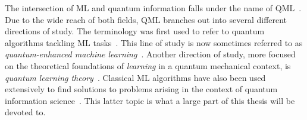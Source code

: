 The intersection of \ac{ML} and quantum information falls under the name of \ac{QML}~\cite{wittek2014quantum,schuld2014introduction,adcock2015advances,biamonte2017quantum}.
Due to the wide reach of both fields, \ac{QML} branches out into several different directions of study.
The terminology was first used to refer to quantum algorithms tackling \ac{ML} tasks~\cite{giovannetti2008quantum,harrow2009quantum,lloyd2013quantum,lloyd2014quantum,rebentrost2014quantum,lloyd2016quantum,rebentrost2018quantum,rebentrost2016quantum}.
This line of study is now sometimes referred to as \emph{quantum-enhanced machine learning}~\cite{wittek2014quantum,schuld2014introduction,dunjko2017machine,ciliberto2018quantum,schuld2018supervised,perdomo-ortiz2018opportunities}.
Another direction of study, more focused on the theoretical foundations of \emph{learning} in a quantum mechanical context, is \emph{quantum learning theory}~\cite{aaronson2007learnability,aaronson2017shadow,arunachalam2017survey,aaronson2018online,rocchetto2019experimental}.
Classical ML algorithms have also been used extensively to find solutions to problems arising in the context of quantum information science~\cite{zdeborov2017machine,spears2018deep,carleo2019machine}.
This latter topic is what a large part of this thesis will be devoted to.

